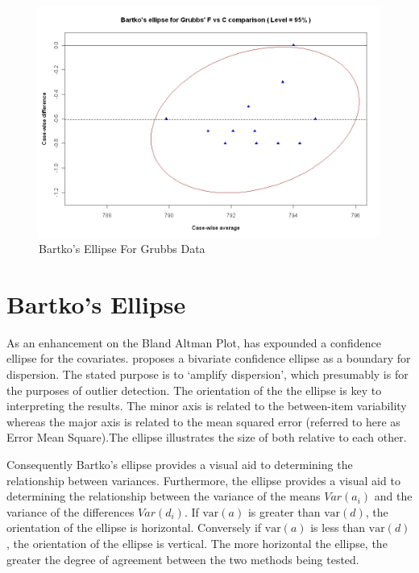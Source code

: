 \documentclass[12pt, a4paper]{report}
\theoremstyle{plain}
\theoremstyle{definition}
\theoremstyle{remark}
\begin{document}
	\begin{figure}[h!]
		\includegraphics[width=130mm]{images/GrubbsBartko.jpeg}
		\caption{Bartko's Ellipse For Grubbs Data}\label{GrubbsBartko}
	\end{figure}

	
	
	


		
		
		
		\section{Bartko's Ellipse}
	
	As an enhancement on the Bland Altman Plot, \citet{Bartko} has
	expounded a confidence ellipse for the covariates. \citet{Bartko} proposes
	a bivariate confidence ellipse as a boundary for dispersion. The stated purpose is to `amplify dispersion', which presumably is for  the purposes of outlier detection. The orientation of the the ellipse is key to interpreting the results. The minor axis is related to the between-item variability whereas the major axis is related to the mean squared error (referred to here as Error Mean Square).The ellipse illustrates the size of both relative to each
	other. 
	
	
	Consequently Bartko's ellipse provides a visual aid to determining the
	relationship between variances. 
	Furthermore, the ellipse provides a visual aid to determining the relationship
	between the variance of the means $Var(a_{i})$ and the variance of the differences $Var(d_{i})$. If $\mbox{var}(a)$ is greater than $\mbox{var}(d)$, the orientation of the ellipse is horizontal. Conversely if $\mbox{var}(a)$ is less than $\mbox{var}(d)$, the orientation of the ellipse is vertical. The more horizontal the ellipse, the greater the degree of agreement between the two methods being tested.
	
\end{document}
